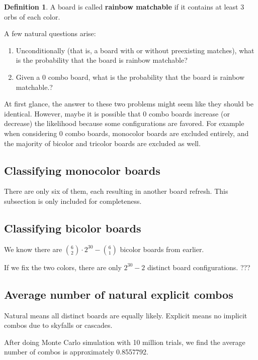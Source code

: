 \documentclass[12pt]{article}
\theoremstyle{definition}
\newtheorem{definition}{Definition}[section]
\begin{document}
\begin{definition}
    A board is called \textbf{rainbow matchable} if it contains at least 3 orbs of each color.
\end{definition}

A few natural questions arise:
\begin{enumerate}
    \item Unconditionally (that is, a board with or without preexisting matches), what is the probability that the board is rainbow matchable?
    \item Given a 0 combo board, what is the probability that the board is rainbow matchable.?
\end{enumerate}
At first glance, the answer to these two problems might seem like they should be identical. However, maybe it is possible that 0 combo boards increase (or decrease) the likelihood because some configurations are favored. For example when considering 0 combo boards, monocolor boards are excluded entirely, and the majority of bicolor and tricolor boards are excluded as well.
\subsection{Classifying monocolor boards}
There are only six of them, each resulting in another board refresh. This subsection is only included for completeness.
\subsection{Classifying bicolor boards}
We know there are $\binom{6}{2}\cdot 2^{30}-\binom{6}{1}$ bicolor boards from earlier.

If we fix the two colors, there are only $2^{30}-2$ distinct board configurations. ???
\subsection{Average number of natural explicit combos}
Natural means all distinct boards are equally likely. Explicit means no implicit combos due to skyfalls or cascades.

After doing Monte Carlo simulation with 10 million trials, we find the average number of combos is approximately 0.8557792.
\end{document}
